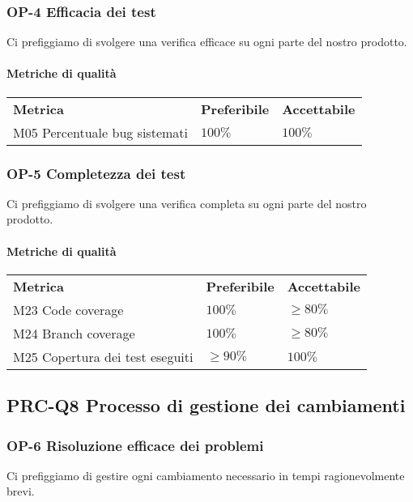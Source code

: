 		\subsubsection{OP-4 Efficacia dei test}
			Ci prefiggiamo di svolgere una verifica efficace su ogni parte del nostro prodotto\glo.
			\paragraph{Metriche di qualità} \mbox{}
			\begin{longtable} {
					>{}p{80mm} 
					>{}p{25mm}
					>{}p{25mm}
				}
				\rowcolor{gray!50}
				\textbf{Metrica} & \textbf{Preferibile} & \textbf{Accettabile} \TBstrut \TBstrut \\
				M05 Percentuale bug sistemati & $100\%$ & $100\%$ \TBstrut \\ [2mm]
			\end{longtable}
		\subsubsection{OP-5 Completezza dei test}
		Ci prefiggiamo di svolgere una verifica completa su ogni parte del nostro prodotto\glo.
		\paragraph{Metriche di qualità} \mbox{}
		\begin{longtable} {
				>{}p{80mm} 
				>{}p{25mm}
				>{}p{25mm}
			}
			\rowcolor{gray!50}
			\textbf{Metrica} & \textbf{Preferibile} & \textbf{Accettabile} \TBstrut \TBstrut \\
			M23 Code coverage & $100\%$ & $\ge 80\%$ \TBstrut \\ [2mm]
			M24 Branch coverage & $100\%$ & $\ge 80\%$ \TBstrut \\ [2mm]
			M25 Copertura dei test eseguiti & $\ge 90\%$ & $100\%$ \TBstrut \\ [2mm]
		\end{longtable}	
			
	\subsection{PRC-Q8 Processo di gestione dei cambiamenti}
		\subsubsection{OP-6 Risoluzione efficace dei problemi}
			Ci prefiggiamo di gestire ogni cambiamento necessario in tempi ragionevolmente brevi.
